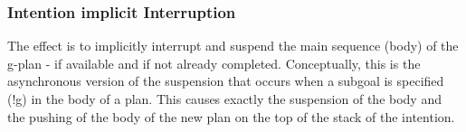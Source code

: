 \subsubsection{Intention implicit Interruption}

The effect is to implicitly interrupt and suspend the main sequence (body) of the g-plan - if available and if not already completed.
%
Conceptually, this is the asynchronous version of the suspension that occurs when a subgoal is specified (!g) in the body of a plan. This causes exactly the suspension of the body and the pushing of the body of the new plan on the top of the stack of the intention.


